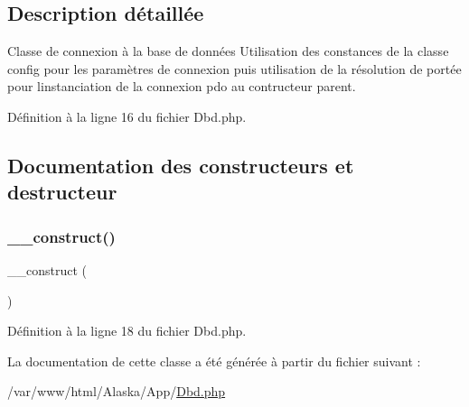 \subsection{Description détaillée}
Classe de connexion à la base de données Utilisation des constances de la classe config pour les paramètres de connexion puis utilisation de la résolution de portée pour l\textquotesingle{}instanciation de la connexion pdo au contructeur parent. 

Définition à la ligne 16 du fichier Dbd.\+php.



\subsection{Documentation des constructeurs et destructeur}
\mbox{\label{class_app_1_1_dbd_a095c5d389db211932136b53f25f39685}} 
\subsubsection{\texorpdfstring{\+\_\+\+\_\+construct()}{\_\_construct()}}
{\footnotesize\ttfamily \+\_\+\+\_\+construct (\begin{DoxyParamCaption}{ }\end{DoxyParamCaption})}



Définition à la ligne 18 du fichier Dbd.\+php.



La documentation de cette classe a été générée à partir du fichier suivant \+:\begin{DoxyCompactItemize}
\item 
/var/www/html/\+Alaska/\+App/\hyperlink{_dbd_8php}{Dbd.\+php}\end{DoxyCompactItemize}
